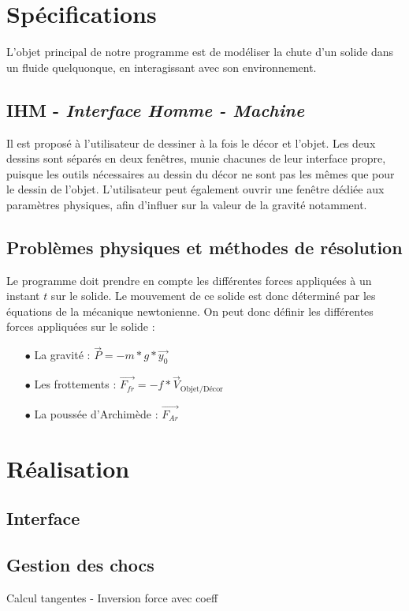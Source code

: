 \section{Spécifications}
L'objet principal de notre programme est de modéliser la chute d'un solide dans un
fluide quelquonque, en interagissant avec son environnement.
\subsection{IHM - \emph{Interface Homme - Machine}}
Il est proposé à l'utilisateur de dessiner à la fois le décor et l'objet.
Les deux dessins sont séparés en deux fenêtres, munie chacunes de leur interface propre,
puisque les outils nécessaires au dessin du décor ne sont pas les mêmes que pour le dessin de l'objet.
L'utilisateur peut également ouvrir une fenêtre dédiée aux paramètres physiques, afin d'influer
sur la valeur de la gravité notamment.
\subsection{Problèmes physiques et méthodes de résolution}
Le programme doit prendre en compte les différentes forces appliquées à 
un instant $t$ sur le solide. Le mouvement de ce solide est donc déterminé
par les équations de la mécanique newtonienne.
On peut donc définir les différentes forces appliquées sur le solide :
\begin{itemize}
\item[$\bullet$] La gravité : \dotfill{} $\overrightarrow{P} = -m*g*\overrightarrow{y_0}$ \hfill{}
\item[$\bullet$] Les frottements : \dotfill{}$\overrightarrow{F_{fr}} = -f*\overrightarrow{V}_{\text{Objet/Décor}}$\hfill{}
\item[$\bullet$] La poussée d'Archimède : \dotfill{} $\overrightarrow{F_{Ar}} $
\end{itemize}

\section{Réalisation}
\subsection{Interface}
\subsection{Gestion des chocs}
Calcul tangentes - Inversion force avec coeff
